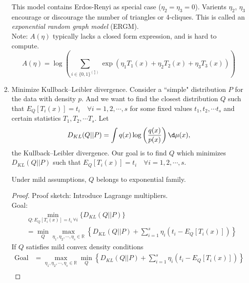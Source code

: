 \documentclass[a4paper]{article}
\begin{document}
\begin{answer}
\begin{enumerate}
\begin{eg}
\begin{equation}
			\end{equation}
		 	This model contains Erdos-Renyi as special case ($\eta_2 = \eta_3 = 0$). Varients $\eta_2$, $\eta_3$ encourage or discourage the number of triangles or 4-cliques. This is called an \emph{exponential random graph model} (ERGM).\\
		 	Note: $A(\eta)$ typically lacks a closed form expression, and is hard to compute.
		 	\begin{equation}
		 		A(\eta) = \log \left(\sum_{i \in \{0,1\}^{\binom{n}{2}}} \exp(\eta_1 T_1(x) + \eta_2 T_2(x) + \eta_3 T_3(x))\right)
			\end{equation} 
 	   	 \end{eg}
		 \item Minimize Kullback–Leibler divergence. Consider a ``simple" distribution $P$ for the data with density $p$. And we want to find the closest distribution $Q$ such that $E_{Q}[T_i(x)] = t_i \quad \forall i = 1,2, \cdots , s$ for some fixed values $t_1, t_2, \cdots t_s$ and certain statistics $T_1, T_2, \cdots T_s$. Let
		\begin{equation}
			D_{KL}(Q||P) = \int q(x)\log\left(\frac{q(x)}{p(x)}\right) \d \mu (x),
		\end{equation}
	 	the Kullback–Leibler divergence. Our goal is to find $Q$ which minimizes $D_{KL}(Q||P)$ such that  $E_{Q}[T_i(x)] = t_i \quad \forall i = 1,2, \cdots , s$.
	 	\begin{claim}
		 	Under mild assumptions, $Q$ belongs to exponential family.
		\end{claim}
	 	\begin{proof}
	 		Proof sketch: Introduce Lagrange multipliers.\\
	 		Goal: 
	 		\begin{equation*}
	 			\begin{aligned}
	 				& \min\limits_{Q: E_Q[T_i(x)] = t_i \ \forall i} \{D_{KL}(Q||P)\} \\
	 				&=\min\limits_{Q} \max\limits_{\eta_1, \eta_2, \cdots, \eta_s \in \mathbb{R}} \left\{D_{KL}(Q||P) + \sum\limits_{i=1}^s \eta_i(t_i - E_Q[T_i(x)])\right\}
	 			\end{aligned}
	 		\end{equation*}
 			\noindent If $Q$ satisfies mild convex density conditions
	 		\begin{equation*}
	 			\begin{aligned}
	 				\text{Goal} &=\max\limits_{\eta_1, \eta_2, \cdots, \eta_s \in \mathbb{R}} \min\limits_{Q} \left\{D_{KL}(Q||P) + \sum\limits_{i=1}^s \eta_i(t_i - E_Q[T_i(x)])\right\} \\

\end{aligned}
\end{equation*}
\end{proof}
\end{enumerate}
\end{answer}
\end{document}

